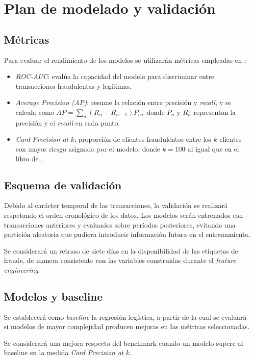 
\section{Plan de modelado y validación}

\subsection{Métricas}
Para evaluar el rendimiento de los modelos se utilizarán métricas empleadas en \textcite[sección 4]{leborgne2022fraud}:
\begin{itemize}
\item \textit{ROC-AUC}: evalúa la capacidad del modelo para discriminar entre transacciones fraudulentas y legítimas.
\item \textit{Average Precision (AP)}: resume la relación entre precisión y \textit{recall}, y se calcula como
\(
    AP=\sum_n(R_n-R_{n-1})P_n,
\)
donde \(P_n\) y \(R_n\) representan la precisión y el \textit{recall} en cada punto.

\item \textit{Card Precision at \(k\)}: proporción de clientes fraudulentos entre los \(k\) clientes con mayor riesgo asignado por el modelo, donde \(k=100\) al igual que en el libro de \textcite{leborgne2022fraud}.
\end{itemize}

\subsection{Esquema de validación}

Debido al carácter temporal de las transacciones, la validación se realizará respetando el orden cronológico de los datos. Los modelos serán entrenados con transacciones anteriores y evaluados sobre períodos posteriores, evitando una partición aleatoria que pudiera introducir información futura en el entrenamiento.

Se considerará un retraso de siete días en la disponibilidad de las etiquetas de fraude, de manera consistente con las variables construidas durante el \textit{feature engineering}.

\subsection{Modelos y baseline}

Se establecerá como \textit{baseline} la regresión logística, a partir de la cual se evaluará si modelos de mayor complejidad producen mejoras en las métricas seleccionadas. 

\begin{nota}
    Se considerará una mejora respecto del benchmark cuando un modelo supere al baseline en la medida \textit{Card Precision at \(k\)}.
\end{nota}
